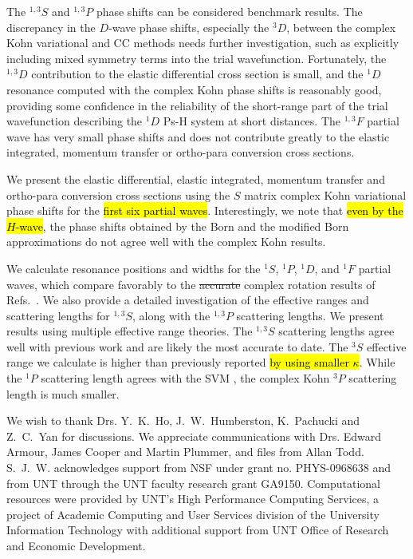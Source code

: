 \documentclass[preprint,showpacs,showkeys,preprintnumbers,amsmath,amssymb,longbibliography,pra,aps]{revtex4-1}
\newcommand{\todoi}{\todo[inline]}
\begin{document}
The $^{1,3}S$ and $^{1,3}P$ phase shifts can be considered benchmark results. 
The discrepancy in the $D$-wave phase shifts, especially the $^3D$, between the 
complex Kohn variational and CC methods needs further investigation, such as 
explicitly including mixed symmetry terms into the trial wavefunction.
Fortunately, the $^{1,3}D$ contribution to the elastic differential 
cross section is small, and the $^1D$ resonance computed with the complex Kohn 
phase shifts is reasonably good, providing some confidence in the reliability 
of the short-range part of the trial wavefunction describing the $^1D$ Ps-H 
system at short distances. The $^{1,3}F$ partial wave has very small phase 
shifts and does not contribute greatly to the elastic integrated, momentum transfer
or ortho-para conversion cross sections.

We present the elastic differential, elastic integrated, momentum 
transfer and ortho-para conversion cross sections using the $S$ matrix 
complex Kohn variational phase shifts for the \hl{first six partial waves}. 
Interestingly, we note that \hl{even by the $H$-wave}, the phase shifts obtained 
by the Born and the modified Born approximations do not agree well with the 
complex Kohn results.

We calculate resonance positions and widths for the $^1S$, $^1P$, $^1D$, and
$^1F$ partial waves, which compare favorably to the \sout{accurate} complex 
rotation results of Refs.~\cite{Yan1999,Yan1998a,Ho1998,Ho2000}. We also 
provide a detailed investigation of the effective ranges and scattering 
lengths for $^{1,3}S$, along with the $^{1,3}P$ scattering lengths. We 
present results using multiple effective range theories.
The $^{1,3}S$ scattering 
lengths agree well with previous work
\cite{VanReeth2003,Blackwood2002,Walters2004,Ivanov2002}
and are likely the most accurate to 
date. The $^3S$ effective range we calculate is higher than previously 
reported \cite{VanReeth2003,Blackwood2002,Ivanov2002}
\hl{by using smaller $\kappa$}.
While the $^1P$ scattering length agrees with the SVM \cite{Ivanov2002}, 
the complex Kohn $^3P$ scattering length is much smaller.


\begin{acknowledgments}
We wish to thank Drs. Y.~K.~Ho, J.~W.~Humberston, K.~Pachucki and Z.~C.~Yan 
for discussions. We appreciate communications with Drs. Edward Armour,
James Cooper and Martin Plummer, and files from Allan Todd.
S.~J.~W. acknowledges support from NSF under grant no.
PHYS-0968638 and from UNT through the UNT faculty research grant GA9150. 
Computational resources were provided by UNT's High Performance Computing 
Services, a project of Academic Computing and User Services division of the 
University Information Technology with additional support from UNT Office of 
Research and Economic Development.
\end{acknowledgments}



\end{document}
